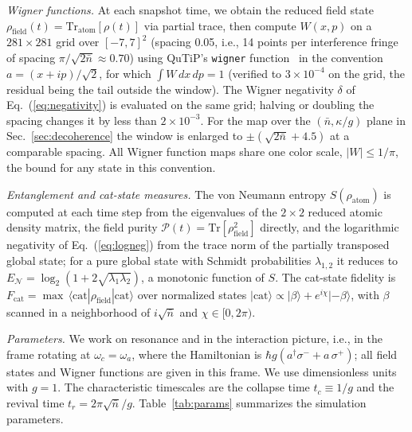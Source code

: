 \documentclass[%
 reprint,
 amsmath,amssymb,
 aps,
 floatfix,
]{revtex4-2}
\begin{document}
\textit{Wigner functions.} At each snapshot time, we obtain the reduced field state $\rho_{\text{field}}(t) = \mathrm{Tr}_{\text{atom}}[\rho(t)]$ via partial trace, then compute $W(x,p)$ on a $281 \times 281$ grid over $[-7, 7]^2$ (spacing 0.05, i.e., 14 points per interference fringe of spacing $\pi/\sqrt{2\bar{n}} \approx 0.70$) using QuTiP's \texttt{wigner} function~\cite{johansson2012} in the convention $a = (x + ip)/\sqrt{2}$, for which $\int W\,dx\,dp = 1$ (verified to $3\times10^{-4}$ on the grid, the residual being the tail outside the window). The Wigner negativity $\delta$ of Eq.~(\ref{eq:negativity}) is evaluated on the same grid; halving or doubling the spacing changes it by less than $2\times10^{-3}$. For the map over the $(\bar{n}, \kappa/g)$ plane in Sec.~\ref{sec:decoherence} the window is enlarged to $\pm(\sqrt{2\bar{n}} + 4.5)$ at a comparable spacing. All Wigner function maps share one color scale, $|W| \leq 1/\pi$, the bound for any state in this convention.

\textit{Entanglement and cat-state measures.} The von Neumann entropy $S(\rho_{\text{atom}})$ is computed at each time step from the eigenvalues of the $2 \times 2$ reduced atomic density matrix, the field purity $\mathcal{P}(t) = \mathrm{Tr}[\rho_{\text{field}}^2]$ directly, and the logarithmic negativity of Eq.~(\ref{eq:logneg}) from the trace norm of the partially transposed global state; for a pure global state with Schmidt probabilities $\lambda_{1,2}$ it reduces to $E_{\mathcal{N}} = \log_2(1 + 2\sqrt{\lambda_1\lambda_2})$, a monotonic function of $S$. The cat-state fidelity is $F_{\text{cat}} = \max\,\langle \text{cat}|\rho_{\text{field}}|\text{cat}\rangle$ over normalized states $|\text{cat}\rangle \propto |\beta\rangle + e^{i\chi}|{-\beta}\rangle$, with $\beta$ scanned in a neighborhood of $i\sqrt{\bar{n}}$ and $\chi \in [0, 2\pi)$.

\textit{Parameters.} We work on resonance and in the interaction picture, i.e., in the frame rotating at $\omega_c = \omega_a$, where the Hamiltonian is $\hbar g(a^\dagger\sigma^- + a\,\sigma^+)$; all field states and Wigner functions are given in this frame. We use dimensionless units with $g = 1$. The characteristic timescales are the collapse time $t_c \equiv 1/g$ and the revival time $t_r = 2\pi\sqrt{\bar{n}}/g$. Table~\ref{tab:params} summarizes the simulation parameters.
\end{document}
